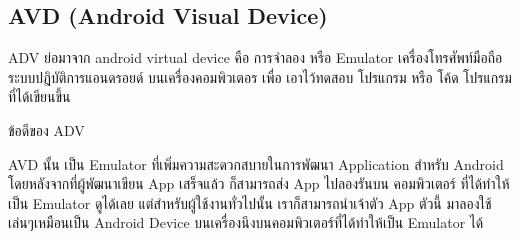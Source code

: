 \subsection{AVD (Android Visual Device)}
ADV ย่อมาจาก android virtual device \cite{adv_is}  คือ การจำลอง หรือ Emulator เครื่องโทรศัพท์มือถือระบบปฎิบัติการแอนดรอยด์ บนเครื่องคอมพิวเตอร เพื่อ เอาไว้ทดสอบ โปรแกรม หรือ โค้ด โปรแกรมที่ได้เขียนขึ้น

ข้อดีของ ADV

AVD นั้น เป็น Emulator ที่เพิ่มความสะดวกสบายในการพัฒนา Application สำหรับ Android โดยหลังจากที่ผู้พัฒนาเขียน App เสร็จแล้ว ก็สามารถส่ง App ไปลองรันบน คอมพิวเตอร์ ที่ได้ทำให้เป็น Emulator ดูได้เลย แต่สำหรับผู้ใช้งานทั่วไปนั้น เราก็สามารถนำเจ้าตัว App ตัวนี้ มาลองใช้เล่นๆเหมือนเป็น Android Device บนเครื่องนึงบนคอมพิวเตอร์ที่ได้ทำให้เป็น Emulator ได้






